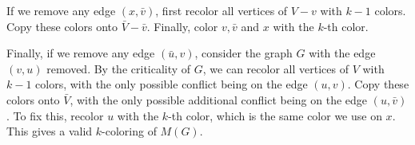 \documentclass[11pt,letterpaper]{article}
\theoremstyle{definition}
\begin{document}
If we remove any edge $(x,\bar{v})$, first recolor all vertices of $V-v$ with $k-1$ colors.
Copy these colors onto $\bar{V} - \bar{v}$. 
Finally, color $v,\bar{v}$ and $x$ with the $k$-th color.

Finally, if we remove any edge $(\bar{u},v)$, consider the graph $G$ with the edge $(v,u)$ removed.
By the criticality of $G$, we can recolor all vertices of $V$ with $k-1$ colors, with the only possible conflict being on the edge $(u,v)$.
Copy these colors onto $\bar{V}$, with the only possible additional conflict being on the edge $(u,\bar{v})$.
To fix this, recolor $u$ with the $k$-th color, which is the same color we use on $x$.
This gives a valid $k$-coloring of $M(G)$.
\end{document}
